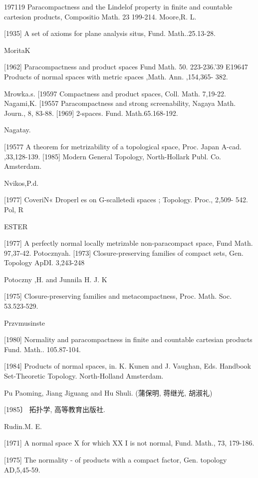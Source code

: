 \documentclass[main.tex]{subfiles}
\begin{document}
	197119 Paracompactness and the Lindelof property in finite and countable
	cartesion products, Compositio Math. 23 199-214.
	Moore,R. L.
	
[1935]
	A set of axioms for plane analysis situs, Fund. Math..25.13-28.
	
\noindent MoritaK

	[1962]
	Paracompactness and product spaces Fund Math. 50. 223-236.'39
	E19647 Products of normal spaces with metric spaces ,Math. Ann. ,154,365-
	382.

\noindent Mrowka.s.
	[19597 Compactness and product spaces, Coll. Math. 7,19-22.
	Nagami,K.
	[19557 Paracompactness and strong screenability, Nagaya Math. Journ., 8,
	83-88.
	[1969]
	2-spaces. Fund. Math.65.168-192.

\noindent Nagatay.

	[19577 A theorem for metrizability of a topological space, Proc. Japan A-cad. ,33,128-139.
	[1985]
	Modern General Topology, North-Hollark Publ. Co.
	~ Amsterdam.

\noindent Nvikos,P.d.

	[1977]
	CoveriN« Droperl
	es on G-scalletedi spaces ; Topology. Proc., 2,509-
	542.
	Pol, R

\noindent ESTER

	[1977] A perfectly normal locally metrizable non-paracompact space, Fund
	Math.
	97,37-42.
	Potocznyah.
	[1973]
	Closure-preserving families of compact sets, Gen. Topology ApDI.
	3,243-248

\noindent Potoczny ,H. and Junnila H. J. K

	[1975]%
	Closure-preserving
	families and metacompactness, Proc.
	Math. Soc.
	53.523-529.

\noindent Przvmusinste

	[1980]
	Normality and paracompactness in finite and countable cartesian
	products Fund. Math.. 105.87-104.

[1984]
	Products of normal spaces, in. K. Kunen and J. Vaughan, Eds.
	Handbook
	Set-Theoretic
	Topology.
	North-Holland
	Amsterdam.

\noindent Pu Paoming, Jiang Jiguang and Hu Shuli. (蒲保明, 蒋继光, 胡淑礼)
	
[1985〕 拓扑学, 高等教育出版社.

\noindent Rudin.M. E.

[1971]
	A normal space X for which XX I is not normal, Fund. Math., 73, 179-186.

[1975] The normality
	- of products with a compact
	factor, Gen. topology AD,5,45-59.
\end{document}
